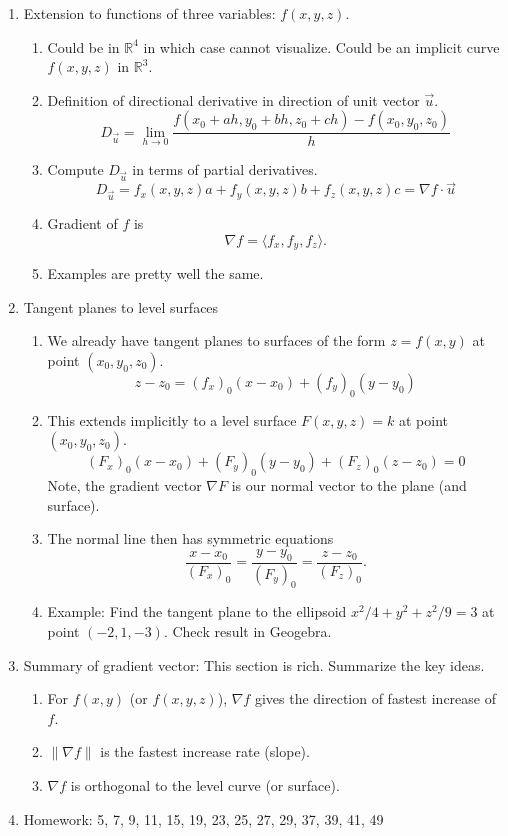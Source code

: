 \documentclass{article}
\begin{document}
\begin{enumerate}
\item Extension to functions of three variables: $f(x,y,z)$.
\begin{enumerate}
\item Could be in $\mathbb{R}^4$ in which case cannot visualize. Could be an implicit curve $f(x,y,z)$ in $\mathbb{R}^3$.
\item Definition of directional derivative in direction of unit vector $\vec{u}$.
\[
D_{\vec{u}} = \lim_{h \rightarrow 0} \frac{f(x_0+ah,y_0+bh,z_0+ch)-f(x_0,y_0,z_0)}{h}
\]
\item Compute $D_{\vec{u}}$ in terms of partial derivatives.
\[
D_{\vec{u}} = f_x(x,y,z)a + f_y(x,y,z)b + f_z(x,y,z)c = \nabla f \cdot \vec{u}
\]
\item Gradient of $f$ is
\[
\nabla f = \langle f_x, f_y, f_z \rangle.
\]
\item Examples are pretty well the same.
\end{enumerate}

\item Tangent planes to level surfaces
\begin{enumerate}
\item We already have tangent planes to surfaces of the form $z=f(x,y)$ at point $(x_0, y_0, z_0)$.
\[
z-z_0 = (f_x)_0 (x-x_0) + (f_y)_0(y-y_0)
\]
\item This extends implicitly to a level surface $F(x,y,z)=k$ at point $(x_0, y_0, z_0)$.
\[
(F_x)_0 (x-x_0) + (F_y)_0(y-y_0) + (F_z)_0(z-z_0) = 0
\]
Note, the gradient vector $\nabla F$ is our normal vector to the plane (and surface).
\item The normal line then has symmetric equations
\[
\frac{x-x_0}{(F_x)_0} = \frac{y-y_0}{(F_y)_0} = \frac{z-z_0}{(F_z)_0}.
\]
\item Example: Find the tangent plane to the ellipsoid $x^2/4 + y^2 + z^2/9 = 3$ at point $(-2,1,-3)$. Check result in Geogebra.
\end{enumerate}

\item Summary of gradient vector: This section is rich. Summarize the key ideas.
\begin{enumerate}
\item For $f(x,y)$ (or $f(x,y,z)$), $\nabla f$ gives the direction of fastest increase of $f$.
\item $\|\nabla f\|$ is the fastest increase rate (slope).
\item $\nabla f$ is orthogonal to the level curve (or surface).
\end{enumerate}

\item Homework: 5, 7, 9, 11, 15, 19, 23, 25, 27, 29, 37, 39, 41, 49

\end{enumerate}
\end{document}
